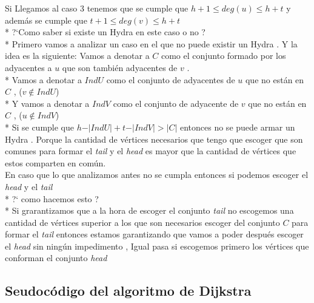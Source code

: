 \documentclass[12pt]{article}
\begin{document}
    \noindent Si Llegamos al caso 3 tenemos que se cumple que  $h+1 \leq deg(u) \leq h + t  $ y adem\'as se cumple que $t+1 \leq deg(v) \leq h + t  $
    \\*
    ?`Como saber si existe un Hydra en este caso o no ? 
    \\*
    Primero vamos a analizar un caso en el que no puede existir un Hydra . Y la idea es la siguiente: 
    Vamos a denotar a $C$ como el conjunto formado por los  adyacentes a $u$ que son tambi\'en adyacentes de $v$ .
    \\* 
    Vamos a denotar a $IndU$ como el conjunto de adyacentes de $u$ que no est\'an en $C$ , ($v \notin IndU$) 
    \\*
    Y vamos a denotar a $IndV$ como el conjunto de adyacente de $v$ que no est\'an en $C$ , ($u \notin IndV$)
    \\*
    Si se cumple que $ h -\vert IndU \vert  +  t - \vert IndV \vert > \vert C \vert $ entonces no se puede armar un Hydra . Porque la cantidad de v\'ertices necesarios 
    que tengo que escoger que son comunes para formar el \textit{tail } y el \textit{head} es mayor que la cantidad de v\'ertices que estos comparten en com\'un. 
    \\[5pt] 
    En caso que lo que analizamos antes no se cumpla entonces si podemos escoger el \textit{head} y el \textit{tail} 
    \\*
    ?` como hacemos esto ? 
    \\*
    Si grarantizamos que a la hora de escoger el conjunto \textit{tail} no escogemos una cantidad de  v\'ertices superior a los que son necesarios escoger del conjunto $C$ para formar el \textit{tail} entonces 
    estamos garantizando que vamos a poder despu\'es escoger el \textit{head} sin ning\'un impedimento , Igual pasa si escogemos primero los v\'ertices que conforman el conjunto \textit{head} 

    \subsection{Seudoc\'odigo del algoritmo de Dijkstra} 
\end{document}
